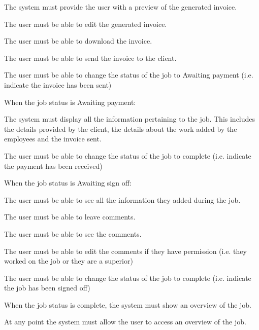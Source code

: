 \documentclass{article}
\begin{document}
\begin{list}{R.}{}
		\begin{list}{R.}{}
			\item The system must provide the user with a preview of the generated invoice. 
			\item The user must be able to edit the generated invoice. 
			\item The user must be able to download the invoice. 
			\item The user must be able to send the invoice to the client.
			\item The user must be able to change the status of the job to Awaiting payment (i.e. indicate the invoice has been sent)
		\end{list}
		\item When the job status is Awaiting payment:
		\begin{list}{R.}{}
			\item The system must display all the information pertaining to the job. This includes the details provided by the client, the details about the work added by the employees and the invoice sent.
			\item The user must be able to change the status of the job to complete (i.e. indicate the payment has been received)			
		\end{list}
		\item When the job status is Awaiting sign off:
		\begin{list}{R.}{}
			\item The user must be able to see all the information they added during the job.
			\item The user must be able to leave comments.
			\item The user must be able to see the comments. 
			\item The user must be able to edit the comments if they have permission (i.e. they worked on the job or they are a superior)
			\item The user must be able to change the status of the job to complete (i.e. indicate the job has been signed off)
		\end{list}
		\item When the job status is complete, the system must show an overview of the job. 
		\item At any point the system must allow the user to access an overview of the job.
	\end{list}
	
\end{document}
